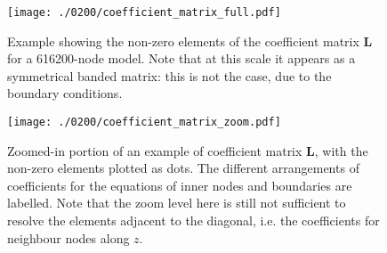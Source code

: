 \begin{figure}[hb]
    \begin{adjustbox}{center}
        \texttt{[image: ./0200/coefficient\_matrix\_full.pdf]}
    \end{adjustbox}
    \caption[Example showing the non-zero elements of the coefficient matrix]{Example showing the non-zero elements of the coefficient matrix $\bm{L}$ for a \num{616200}-node model. Note that at this scale it appears as a symmetrical banded matrix: this is not the case, due to the boundary conditions.}
    \label{suppl:fig:L_coefficients_full}
\end{figure}

\begin{figure}[h]
    \begin{adjustbox}{center}
        \texttt{[image: ./0200/coefficient\_matrix\_zoom.pdf]}
    \end{adjustbox}
    \caption[Zoomed-in portion of an example of coefficient matrix, labelled.]{Zoomed-in portion of an example of coefficient matrix $\bm{L}$, with the non-zero elements plotted as dots. The different arrangements of coefficients for the equations of inner nodes and boundaries are labelled. Note that the zoom level here is still not sufficient to resolve the elements adjacent to the diagonal, i.e. the coefficients for neighbour nodes along $z$.}
    \label{suppl:fig:L_coefficients_zoom}
\end{figure}



